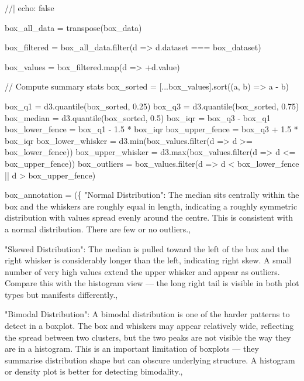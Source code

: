\documentclass[
  letterpaper,
  DIV=11,
  numbers=noendperiod]{scrartcl}
\newenvironment{Shaded}{\begin{snugshade}}{\end{snugshade}}
\newcommand{\NormalTok}[1]{\textcolor[rgb]{0.00,0.23,0.31}{#1}}
\begin{document}
\begin{Shaded}
\begin{Highlighting}[]
\NormalTok{//| echo: false}

\NormalTok{box\_all\_data = transpose(box\_data)}

\NormalTok{box\_filtered = box\_all\_data.filter(d =\textgreater{} d.dataset === box\_dataset)}

\NormalTok{box\_values = box\_filtered.map(d =\textgreater{} +d.value)}

\NormalTok{// Compute summary stats}
\NormalTok{box\_sorted = [...box\_values].sort((a, b) =\textgreater{} a {-} b)}

\NormalTok{box\_q1 = d3.quantile(box\_sorted, 0.25)}
\NormalTok{box\_q3 = d3.quantile(box\_sorted, 0.75)}
\NormalTok{box\_median = d3.quantile(box\_sorted, 0.5)}
\NormalTok{box\_iqr = box\_q3 {-} box\_q1}
\NormalTok{box\_lower\_fence = box\_q1 {-} 1.5 * box\_iqr}
\NormalTok{box\_upper\_fence = box\_q3 + 1.5 * box\_iqr}
\NormalTok{box\_lower\_whisker = d3.min(box\_values.filter(d =\textgreater{} d \textgreater{}= box\_lower\_fence))}
\NormalTok{box\_upper\_whisker = d3.max(box\_values.filter(d =\textgreater{} d \textless{}= box\_upper\_fence))}
\NormalTok{box\_outliers = box\_values.filter(d =\textgreater{} d \textless{} box\_lower\_fence || d \textgreater{} box\_upper\_fence)}

\NormalTok{box\_annotation = (\{}
\NormalTok{  "Normal Distribution": \textasciigrave{}The median sits centrally within the box and the whiskers }
\NormalTok{    are roughly equal in length, indicating a roughly symmetric distribution with }
\NormalTok{    values spread evenly around the centre. This is consistent with a normal }
\NormalTok{    distribution. There are few or no outliers.\textasciigrave{},}

\NormalTok{  "Skewed Distribution": \textasciigrave{}The median is pulled toward the left of the box and the }
\NormalTok{    right whisker is considerably longer than the left, indicating right skew. A }
\NormalTok{    small number of very high values extend the upper whisker and appear as outliers. }
\NormalTok{    Compare this with the histogram view — the long right tail is visible in both }
\NormalTok{    plot types but manifests differently.\textasciigrave{},}

\NormalTok{  "Bimodal Distribution": \textasciigrave{}A bimodal distribution is one of the harder patterns to }
\NormalTok{    detect in a boxplot. The box and whiskers may appear relatively wide, reflecting }
\NormalTok{    the spread between two clusters, but the two peaks are not visible the way they }
\NormalTok{    are in a histogram. This is an important limitation of boxplots — they summarise }
\NormalTok{    distribution shape but can obscure underlying structure. A histogram or density }
\NormalTok{    plot is better for detecting bimodality.\textasciigrave{},}


\end{Highlighting}
\end{Shaded}
\end{document}
